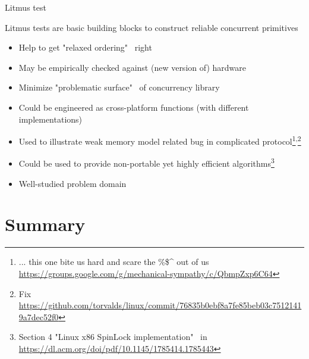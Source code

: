 \begin{frame}[fragile]{Litmus test}

Litmus tests are basic building blocks to construct reliable concurrent primitives

\begin{itemize}
    \pause \item Help to get "relaxed ordering" \ right
    \pause \item May be empirically checked against (new version of) hardware
    \pause \item Minimize "problematic surface" \ of concurrency library
    \pause \item Could be engineered as cross-platform functions (with different implementations)
    \pause \item Used to illustrate weak memory model related bug in complicated protocol\footnote<6->{\tiny ... this one bite us hard and scare the \%\$\^\! out of us \url{https://groups.google.com/g/mechanical-sympathy/c/QbmpZxp6C64}}\textsuperscript{,}\footnote<6->{\tiny Fix \url{https://github.com/torvalds/linux/commit/76835b0ebf8a7fe85beb03c75121419a7dec52f0}}
    \pause \item Could be used to provide non-portable yet highly efficient algorithms\footnote<7->{\tiny Section 4 "Linux x86 SpinLock implementation" \ in \url{https://dl.acm.org/doi/pdf/10.1145/1785414.1785443}}
    \pause \item Well-studied problem domain
\end{itemize}

\end{frame}


\section{Summary}


